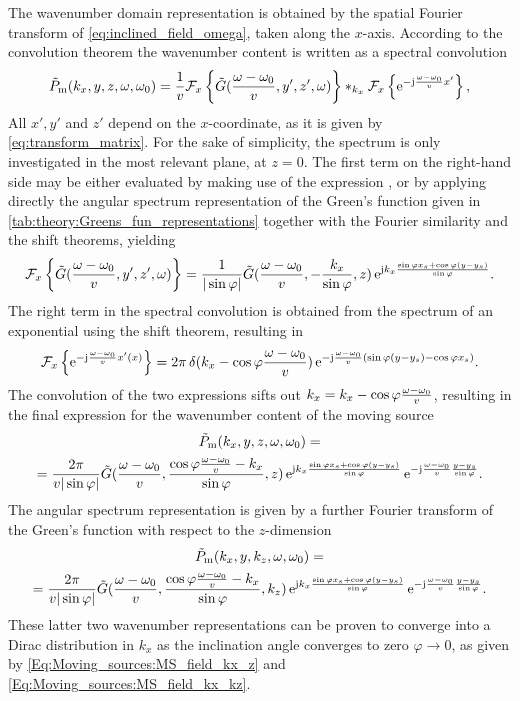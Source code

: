 The wavenumber domain representation is obtained by the spatial Fourier transform of \eqref{eq:inclined_field_omega}, taken along the $x$-axis.
According to the convolution theorem the wavenumber content is written as a spectral convolution
\begin{equation}
\tilde{P}_{\mathrm{m}}(k_x,y,z,\omega,\omega_0) =
\frac{1}{v}
\FT[x]{
\tilde{G}(\frac{\omega-\omega_0}{v}, y', z', \omega) }
\ast_{k_x}
\FT[x]{
\te^{-\ti \frac{\omega-\omega_0}{v} x' }
},
\end{equation}
All $x', y'$ and $z'$ depend on the $x$-coordinate, as it is given by \eqref{eq:transform_matrix}.
For the sake of simplicity, the spectrum is only investigated in the most relevant plane, at $z = 0$.
The first term on the right-hand side may be either evaluated by making use of the expression \cite[(6.677,9.)]{Gradshteyn2007}, or by applying directly the angular spectrum representation of the Green's function given in \eqref{tab:theory:Greens_fun_representations} together with the Fourier similarity and the shift theorems, yielding
\begin{equation}
\mathcal{F}_x \left\{
\tilde{G}(\frac{\omega-\omega_0}{v}, y', z', \omega) \right\} =
\frac{1}{|\sinfi|} \tilde{G}( \frac{\omega-\omega_0}{v}, - \frac{k_x}{\sinfi} , z ) \, \te^{\ti k_x \frac{\sinfi x_s + \cosfi (y-y_s)}{\sinfi}}.
\end{equation}
The right term in the spectral convolution is obtained from the spectrum of an exponential using the shift theorem, resulting in
\begin{equation}
\mathcal{F}_x \left\{
\te^{-\ti \frac{\omega-\omega_0}{v} x'(x)}
 \right\} = 2\pi \, \delta(k_x - \cosfi \frac{\omega-\omega_0}{v}) \, \te^{-\ti \frac{\omega-\omega_0}{v}\left( \sinfi(y-y_s) - \cosfi x_s \right)}.
\end{equation}
The convolution of the two expressions sifts out $k_x = k_x - \cosfi \frac{\omega-\omega_0}{v}$, resulting in the final expression for the wavenumber content of the moving source
\begin{multline}
\tilde{P}_{\mathrm{m}}(k_x,y,z,\omega,\omega_0) = \\ =
\frac{2\pi}{v|\sinfi|} \tilde{G}( \frac{\omega-\omega_0}{v}, \frac{\cosfi \frac{\omega-\omega_0}{v}- k_x }{\sinfi} , z )  
\, \te^{\ti k_x\frac{\sinfi x_s + \cosfi (y-y_s)}{\sinfi}}
\, \te^{-\ti \frac{\omega-\omega_0}{v} \frac{y-y_s}{\sinfi}}.
\end{multline}
The angular spectrum representation is given by a further Fourier transform of the Green's function with respect to the $z$-dimension
\begin{multline}
\tilde{P}_{\mathrm{m}}(k_x,y,k_z,\omega,\omega_0) = \\ =
\frac{2\pi}{v|\sinfi|} \tilde{G}( \frac{\omega-\omega_0}{v}, \frac{\cosfi \frac{\omega-\omega_0}{v}- k_x }{\sinfi} , k_z )  
\, \te^{\ti k_x\frac{\sinfi x_s + \cosfi (y-y_s)}{\sinfi}}
\, \te^{-\ti \frac{\omega-\omega_0}{v} \frac{y-y_s}{\sinfi}}.
\end{multline}
These latter two wavenumber representations can be proven to converge into a Dirac distribution in $k_x$ as the inclination angle converges to zero $\varphi \rightarrow 0$, as given by \eqref{Eq:Moving_sources:MS_field_kx_z} and \eqref{Eq:Moving_sources:MS_field_kx_kz}.